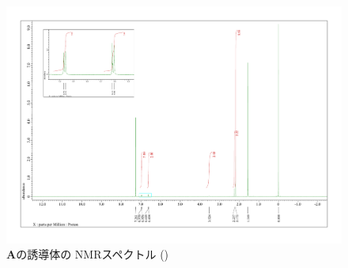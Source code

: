 \documentclass{ltjsarticle}
\theoremstyle{definition}
\numberwithin{equation}{section}
\begin{document}
\begin{figure}[htbp]
\begin{center}
\includegraphics[width = 15 cm]{NMR_5-1-A-2.pdf}
\caption{\textbf{A}の誘導体の NMRスペクトル ()}
\label{NMR_5-1-A-2}
\end{center}
\end{figure}
\end{document}
